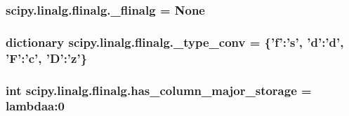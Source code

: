 \subsubsection[{\+\_\+flinalg}]{\setlength{\rightskip}{0pt plus 5cm}scipy.\+linalg.\+flinalg.\+\_\+flinalg = None}\label{namespacescipy_1_1linalg_1_1flinalg_a3e0a9c2ee3992b2e6c73dec0d79af5f0}
\hypertarget{namespacescipy_1_1linalg_1_1flinalg_a998dbabb3a6e06dae7bfe3f510614190}{}
\subsubsection[{\+\_\+type\+\_\+conv}]{\setlength{\rightskip}{0pt plus 5cm}dictionary scipy.\+linalg.\+flinalg.\+\_\+type\+\_\+conv = \{'f'\+:'{\bf s}', 'd'\+:'d', 'F'\+:'c', '{\bf D}'\+:'z'\}}\label{namespacescipy_1_1linalg_1_1flinalg_a998dbabb3a6e06dae7bfe3f510614190}
\hypertarget{namespacescipy_1_1linalg_1_1flinalg_acbde14c8f0d45ef74649edc9dc7249dc}{}
\subsubsection[{has\+\_\+column\+\_\+major\+\_\+storage}]{\setlength{\rightskip}{0pt plus 5cm}int scipy.\+linalg.\+flinalg.\+has\+\_\+column\+\_\+major\+\_\+storage = lambdaa\+:0}\label{namespacescipy_1_1linalg_1_1flinalg_acbde14c8f0d45ef74649edc9dc7249dc}
